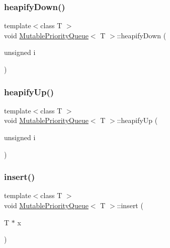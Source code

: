 \subsubsection{\texorpdfstring{heapify\+Down()}{heapifyDown()}}
{\footnotesize\ttfamily template$<$class T $>$ \\
void \mbox{\hyperlink{class_mutable_priority_queue}{Mutable\+Priority\+Queue}}$<$ T $>$\+::heapify\+Down (\begin{DoxyParamCaption}\item[{unsigned}]{i }\end{DoxyParamCaption})\hspace{0.3cm}{\ttfamily [private]}}

\mbox{\label{class_mutable_priority_queue_ae2518c7a1be2bd1e7c633d82dede5450}} 
\subsubsection{\texorpdfstring{heapify\+Up()}{heapifyUp()}}
{\footnotesize\ttfamily template$<$class T $>$ \\
void \mbox{\hyperlink{class_mutable_priority_queue}{Mutable\+Priority\+Queue}}$<$ T $>$\+::heapify\+Up (\begin{DoxyParamCaption}\item[{unsigned}]{i }\end{DoxyParamCaption})\hspace{0.3cm}{\ttfamily [private]}}

\mbox{\label{class_mutable_priority_queue_a058fc182052af82e10cc3719e448b62d}} 
\subsubsection{\texorpdfstring{insert()}{insert()}}
{\footnotesize\ttfamily template$<$class T $>$ \\
void \mbox{\hyperlink{class_mutable_priority_queue}{Mutable\+Priority\+Queue}}$<$ T $>$\+::insert (\begin{DoxyParamCaption}\item[{T $\ast$}]{x }\end{DoxyParamCaption})}

